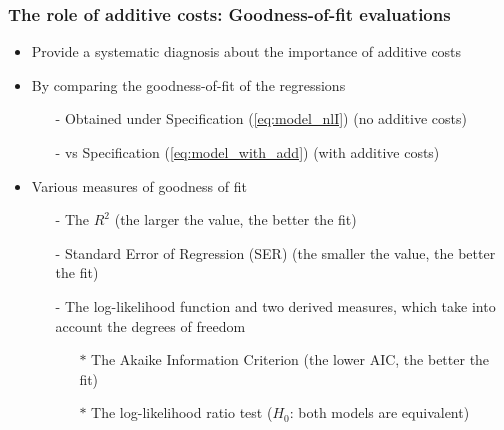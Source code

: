 \documentclass[10 pt,Helvetica, french]{beamer}
\begin{document}
\begin{frame}[label=app_goodnessfit]
\frametitle{The role of additive costs: Goodness-of-fit evaluations}
\begin{itemize}
\item Provide a systematic diagnosis about the importance of additive costs  \vspace{0.1cm}
\item By comparing the goodness-of-fit of the regressions
\begin{itemize}
\item[-] Obtained under Specification (\ref{eq:model_nlI}) (no additive costs)
\item[-] vs Specification (\ref{eq:model_with_add}) (with additive costs) \vspace{0.1cm}
\end{itemize}
\item Various measures of goodness of fit
\begin{itemize}
\item[-] The $R^2$ (the larger the value, the better the fit) \vspace{0.1cm}
\item[-] Standard Error of Regression (SER) (the smaller the value, the better the fit) \vspace{0.1cm}
\item[-] The log-likelihood function and two derived measures, which take into account the degrees of freedom \vspace{0.1cm}
\begin{itemize}
\item[$\ast$] The Akaike Information Criterion (the lower AIC, the better the fit) \vspace{0.1cm}
\item[$\ast$] The log-likelihood ratio test ($H_0$: both models are equivalent)
\end{itemize}
\end{itemize}

\end{itemize}

\end{frame}
\end{document}
